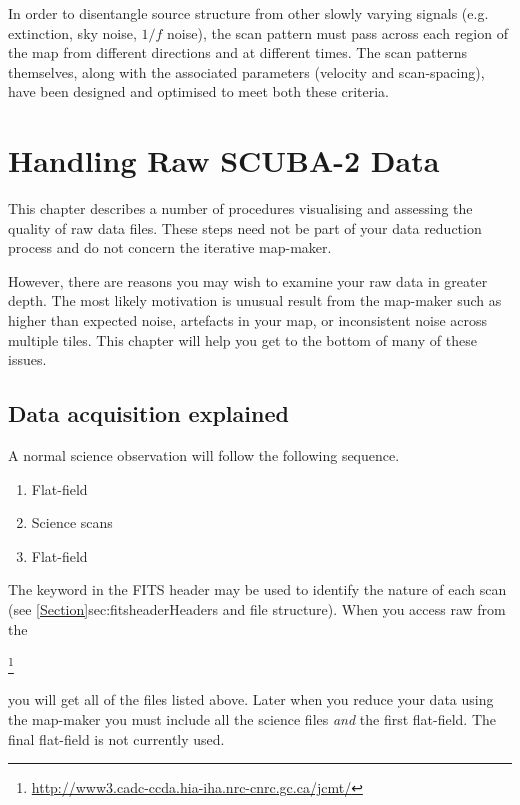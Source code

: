 \documentclass[11pt,oneside,chapters]{starlink}
\begin{document}
In order to disentangle source structure from other
slowly varying signals (e.g. extinction, sky noise, $1/f$ noise), the
scan pattern must pass across each region of the map from different
directions and at different times. The scan patterns themselves, along
with the associated parameters (velocity and scan-spacing), have been
designed and optimised to meet both these criteria.




\chapter{Handling Raw SCUBA-2 Data}
\label{sec:raw}

This chapter describes a number of procedures visualising and
assessing the quality of raw data files.  These steps need not be part
of your data reduction process and do not concern the iterative
map-maker.

However, there are reasons you may wish to examine your raw data in
greater depth. The most likely motivation is unusual result from the
map-maker such as higher than expected noise, artefacts in your map,
or inconsistent noise across multiple tiles.  This chapter will help
you get to the bottom of many of these issues.

\section{Data acquisition explained}
A normal science observation will follow the following sequence.
\vspace{-2mm}
\begin{enumerate}\itemsep-0.2em
\item Flat-field
\item Science scans
\item Flat-field
\end{enumerate}
\vspace{-2mm}
The  keyword in the FITS header may be used to
identify the nature of each scan (see
\cref{Section}{sec:fitsheader}{Headers and file structure}).
When you access raw from the 
\begin{latexonly}
\hspace{-0.5em}\footnote{\url{http://www3.cadc-ccda.hia-iha.nrc-cnrc.gc.ca/jcmt/}}
\end{latexonly}
you will get all of the files listed above. Later when you
reduce your data using the map-maker you must include all
the science files \emph{and} the first flat-field.
The final flat-field is not currently used.
\end{document}

